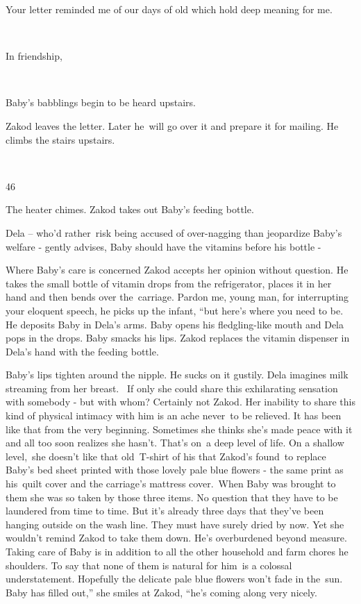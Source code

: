 \documentclass[twoside,11pt]{book}
\begin{document}
Your letter reminded me of our days of old which hold deep meaning for me. 

~

In friendship,

~

Baby's babblings begin to be heard upstairs.~~~~~ 

Zakod leaves the letter. Later he~will go over it and prepare it for mailing. He climbs the stairs upstairs.

~

46\ 

The heater chimes. Zakod takes out Baby's feeding bottle. 

Dela -- who'd rather~risk being accused of over-nagging than jeopardize Baby's welfare - gently advises,
{\textquotedbl}Baby should have the vitamins before his bottle -{\textquotedbl} 

Where Baby's care is concerned Zakod accepts her opinion without question. He takes the small bottle of vitamin drops
from the refrigerator, places it in her hand and then bends over the\ carriage. {\textquotedbl}Pardon me, young man,
for interrupting your eloquent speech,{\textquotedbl} he picks up the infant, ``but here's where you need to
be.{\textquotedbl} He deposits Baby in Dela's arms. Baby opens his fledgling-like mouth and Dela pops in the drops.
Baby smacks his lips. Zakod replaces the vitamin dispenser in Dela's hand with the feeding bottle. 

Baby's lips tighten around the nipple. He sucks on it gustily. Dela imagines milk streaming from her breast. \ If only
she could share this exhilarating sensation with somebody - but with whom? Certainly not Zakod. Her inability to share
this kind of physical intimacy with him is an ache never\ to be relieved. It has been like that from the very
beginning. Sometimes she thinks she's made peace with it and all too soon realizes she hasn't. That's on\ a deep level
of life. On a shallow level,\ she doesn't like that old\ T{}-shirt of his that Zakod's found\ to replace Baby's bed
sheet printed with those lovely pale blue flowers - the same print as his\ quilt cover and the carriage's mattress
cover.\ When Baby was brought to them she was so taken by those three items. No question that they have to be laundered
from time to time. But it's already three days that they've been hanging outside on the wash line. They must have
surely dried by now. Yet she wouldn{}'t remind Zakod to take them down. He's overburdened beyond measure. Taking care
of Baby is in addition to all the other household and farm chores he shoulders. To say that none of them is natural for
him~is a colossal understatement. Hopefully the delicate pale blue flowers won't fade in the~sun. {\textquotedbl}Baby
has filled out,'' she smiles at Zakod, ``he's coming along very nicely.{\textquotedbl} 
\end{document}
